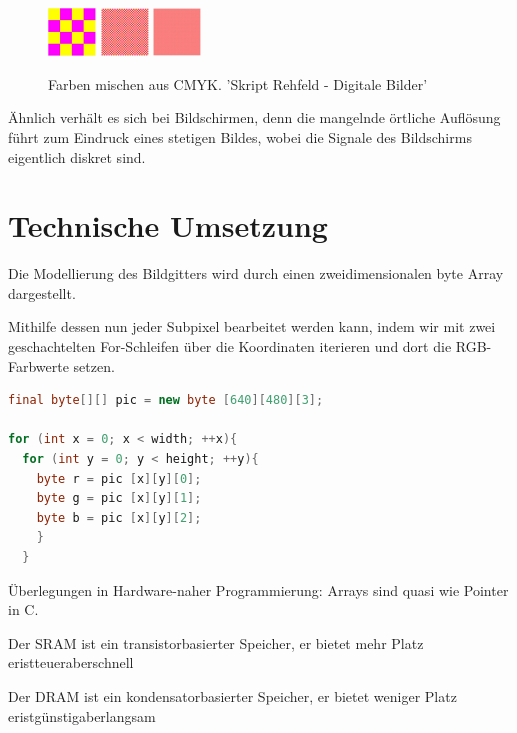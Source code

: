 \documentclass[tog]{acmsiggraph}
\begin{document}
\begin{figure}[ht]
  \centering
  \includegraphics[width=0.5in]{images/gelbMagentaMusterGrob}
  \includegraphics[width=0.5in]{images/gelbMagentaMusterFeiner}
  \includegraphics[width=0.5in]{images/gelbMagentaMusterFein}
  \caption{Farben mischen aus CMYK. 'Skript Rehfeld - Digitale Bilder'}
  \label{fig:Aus Grundfarben wird neue eine Farbe}
\end{figure}

Ähnlich verhält es sich bei Bildschirmen, denn die mangelnde örtliche Auflösung führt zum Eindruck eines stetigen Bildes, wobei die Signale des Bildschirms eigentlich diskret sind.

\section{Technische Umsetzung}
Die Modellierung des Bildgitters wird durch einen zweidimensionalen byte Array dargestellt.

Mithilfe dessen nun jeder Subpixel bearbeitet werden kann, indem wir mit zwei geschachtelten For-Schleifen über die Koordinaten iterieren und dort die RGB-Farbwerte setzen.
\begin{lstlisting}[language=Java]
final byte[][] pic = new byte [640][480][3];

for (int x = 0; x < width; ++x){
  for (int y = 0; y < height; ++y){
    byte r = pic [x][y][0];
    byte g = pic [x][y][1];
    byte b = pic [x][y][2];
    }
  }
\end{lstlisting}

Überlegungen in Hardware-naher Programmierung: Arrays sind quasi wie Pointer in C.

Der SRAM ist ein transistorbasierter Speicher, er bietet mehr Platz \rightarrow er\:ist\:teuer\:aber\:schnell

Der DRAM ist ein kondensatorbasierter Speicher, er bietet weniger Platz \rightarrow er\:ist\:günstig\:aber\:langsam
\end{document}

